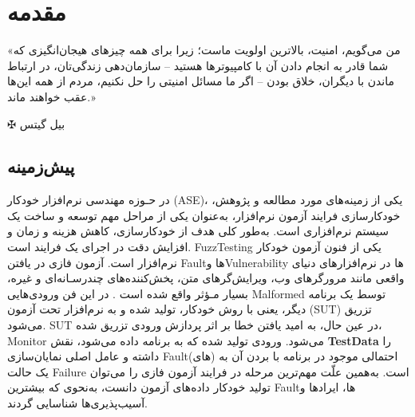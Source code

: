 
\chapter{مقدمه}\label{chapter1}
\thispagestyle{empty}


\epigraph{
«من می‌گویم، امنیت، بالاترین اولویت ماست؛ زیرا برای همه چیزهای هیجان‌انگیزی که شما قادر به انجام دادن آن با کامپیوترها هستید – سازمان‌دهی زندگی‌تان، در ارتباط ماندن با دیگران، خلاق بودن – اگر ما مسائل امنیتی را حل نکنیم، مردم از همه این‌ها عقب خواهند ماند.»
}
{$ \maltese $ {\large بیل گیتس}}





\section{پیش‌زمینه}
در حـوزه مهندسی نرم‌افزار خودکار (\gls{ASE})،
یکی از زمینه‌های مورد مطالعه و پژوهش، خودکارسازی فرایند آزمون نرم‌افزار، به‌عنوان یکی از مراحل مهم توسعه و ساخت یک سیستم نرم‌افزاری است. به‌طور کلی هدف از خودکارسازی، کاهش هزینه و زمان و افزایش دقت در اجرای یک فرایند است.
\gls{FuzzTesting}
یکی از فنون آزمون خودکار نرم‌افزار است. آزمون فازی در یافتن
\gls{Fault}ها و\gls{Vulnerability} ها در نرم‌افزارهای دنیای واقعی مانند مرورگرهای وب، ویرایش‌گرهای متن، پخش‌کننده‌های چندرسـانه‌ای و غیره، بسیار مـؤثر واقع شده است
\cite{Takanen:2008:FSS:1404500, Sutton:2007:FBF:1324770}.
در این فن ورودی‌هایی
\gls{Malformed}
توسط یک برنامه دیگر، یعنی با روش خودکار، تولید شده و به نرم‌افزار تحت آزمون (\gls{SUT})
تزریق می‌شود.
\gls{SUT}
در عین حال، به امید یافتن خطا بر اثر پردازش ورودی تزریق شده، \gls{Monitor} می‌شود. ورودی تولید شده که به برنامه داده می‌شود، نقش
\textbf{\gls{TestData}}
را داشته و عامل اصلی نمایان‌سازی \gls{Fault}(های) احتمالی موجود در برنامه با بردن آن به یک حالت \gls{Failure}
 است. به‌همین علّت مهم‌ترین مرحله در فرایند آزمون فازی  را می‌توان تولید خودکار داده‌های آزمون دانست، به‌نحوی که بیشترین \gls{Fault}ها، ایراد‌ها و آسیب‌پذیری‌ها شناسایی گردند.





